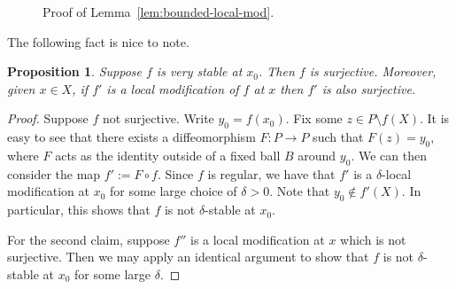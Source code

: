 \documentclass[11pt,a4paper]{amsart}
\newtheorem{proposition}[theorem]{Proposition}
\theoremstyle{definition}
\begin{document}
\begin{figure}

    \caption{Proof of Lemma~\ref{lem:bounded-local-mod}.}
    \label{fig:retracting-annulus}
\end{figure}


The following fact is nice to note.

\begin{proposition}\label{prop:stable-surj}
    Suppose $f$ is very stable at $x_0$. Then $f$ is surjective. Moreover, given $x \in X$, if $f'$ is a local modification of $f$ at $x$ then $f'$ is also surjective.
\end{proposition}

\begin{proof}
    Suppose $f$ not surjective. Write $y_0 = f(x_0)$. Fix some $z \in P \setminus f(X)$. It is easy to see that there exists a diffeomorphism $F : P \to P$ such that $F(z) = y_0$, where $F$ acts as the identity outside of a fixed ball $B$ around $y_0$. We can then consider the map $f' := F \circ f$. Since $f$ is regular, we have that $f'$ is a $\delta$-local modification at $x_0$ for some large choice of $\delta > 0$. Note that $y_0 \not \in f'(X)$. In particular, this shows that $f$ is not $\delta$-stable at $x_0$.

    For the second claim, suppose $f''$ is a local modification at $x$ which is not surjective. Then we may apply an identical argument to show that $f$ is not $\delta$-stable at $x_0$ for some large $\delta$. 
\end{proof}
\end{document}
